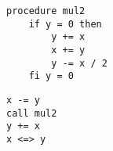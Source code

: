 \begin{lstlisting}
procedure mul2
    if y = 0 then
        y += x
        x += y
        y -= x / 2
    fi y = 0
\end{lstlisting}


\begin{lstlisting}
x -= y
call mul2
y += x
x <=> y
\end{lstlisting}
